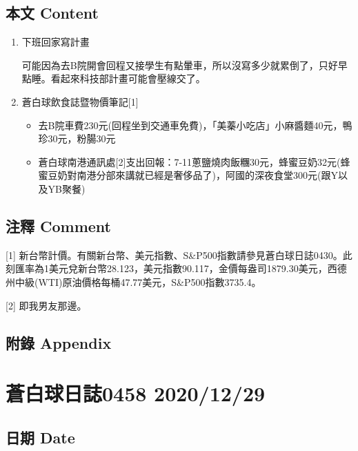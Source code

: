 \documentclass[a5paper, 11pt
]{book}
\providecommand{\tightlist}{%
  \setlength{\itemsep}{0pt}\setlength{\parskip}{0pt}}
\begin{document}
\hypertarget{ux672cux6587-content-27}{%
\subsection{本文 Content}\label{ux672cux6587-content-27}}

\begin{enumerate}
\def\labelenumi{\arabic{enumi}.}
\item
  下班回家寫計畫

  可能因為去B院開會回程又接學生有點暈車，所以沒寫多少就累倒了，只好早點睡。看起來科技部計畫可能會壓線交了。
\item
  蒼白球飲食誌暨物價筆記{[}1{]}

  \begin{itemize}
  \tightlist
  \item
    去B院車費230元(回程坐到交通車免費)，「美蓁小吃店」小麻醬麵40元，鴨珍30元，粉腸30元
  \item
    蒼白球南港通訊處{[}2{]}支出回報：7-11蔥鹽燒肉飯糰30元，蜂蜜豆奶32元(蜂蜜豆奶對南港分部來講就已經是奢侈品了)，阿國的深夜食堂300元(跟Y以及YB聚餐)
  \end{itemize}
\end{enumerate}

\hypertarget{ux6ce8ux91cb-comment-27}{%
\subsection{注釋 Comment}\label{ux6ce8ux91cb-comment-27}}

{[}1{]}
新台幣計價。有關新台幣、美元指數、S\&P500指數請參見蒼白球日誌0430。此刻匯率為1美元兌新台幣28.123，美元指數90.117，金價每盎司1879.30美元，西德州中級(WTI)原油價格每桶47.77美元，S\&P500指數3735.4。

{[}2{]} 即我男友那邊。

\hypertarget{ux9644ux9304-appendix-27}{%
\subsection{附錄 Appendix}\label{ux9644ux9304-appendix-27}}

\hypertarget{ux84bcux767dux7403ux65e5ux8a8c0458-20201229}{%
\section{蒼白球日誌0458
2020/12/29}\label{ux84bcux767dux7403ux65e5ux8a8c0458-20201229}}

\hypertarget{ux65e5ux671f-date-28}{%
\subsection{日期 Date}\label{ux65e5ux671f-date-28}}
\end{document}
